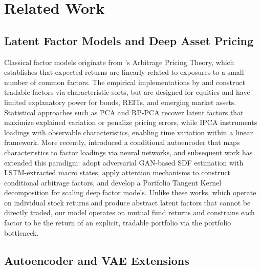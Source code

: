 \section{Related Work}\label{sec:related}

\subsection{Latent Factor Models and Deep Asset Pricing}

Classical factor models originate from \citet{Ross1976apt}'s Arbitrage Pricing Theory, which establishes that expected returns are linearly related to exposures to a small number of common factors. The empirical implementations by \citet{FamaFrench2015fivefactor} and \citet{Carhart1997persistence} construct tradable factors via characteristic sorts, but are designed for equities and have limited explanatory power for bonds, REITs, and emerging market assets. Statistical approaches such as PCA \citep{BaiNg2002factors} and RP-PCA \citep{LettauPelger2020factors} recover latent factors that maximize explained variation or penalize pricing errors, while IPCA \citep{KellyPruittSu2019ipca} instruments loadings with observable characteristics, enabling time variation within a linear framework. More recently, \citet{GuKellyXiu2021autoencoder} introduced a conditional autoencoder that maps characteristics to factor loadings via neural networks, and subsequent work has extended this paradigm: \citet{ChenPelgerZhu2024deep} adopt adversarial GAN-based SDF estimation with LSTM-extracted macro states, \citet{Epstein2025attention} apply attention mechanisms to construct conditional arbitrage factors, and \citet{Kelly2024large} develop a Portfolio Tangent Kernel decomposition for scaling deep factor models. Unlike these works, which operate on individual stock returns and produce abstract latent factors that cannot be directly traded, our model operates on mutual fund returns and constrains each factor to be the return of an explicit, tradable portfolio via the portfolio bottleneck.

\subsection{Autoencoder and VAE Extensions}

